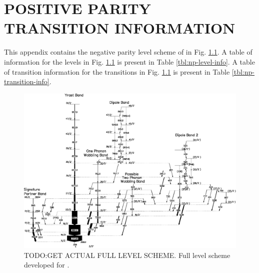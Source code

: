 %
%

\chapter{POSITIVE PARITY TRANSITION INFORMATION}
\label{app:pos-par-info}
This appendix contains the negative parity level scheme of \pr{} in Fig. \ref{fig:np-full-lvl-scheme}. A table of information for the levels in Fig. \ref{fig:np-full-lvl-scheme} is present in Table \ref{tbl:np-level-info}. A table of transition information for the transitions in Fig. \ref{fig:np-full-lvl-scheme} is present in Table \ref{tbl:np-transition-info}.

\begin{landscape}
\begin{figure}[h!]
\centerline{\includegraphics[height=\textheight]{./img/app_pp/135Pr_Np_for_diss.eps}}
	\caption{TODO:GET ACTUAL FULL LEVEL SCHEME. Full level scheme developed for \pr{}.\label{fig:np-full-lvl-scheme}}
\end{figure}
\end{landscape}

